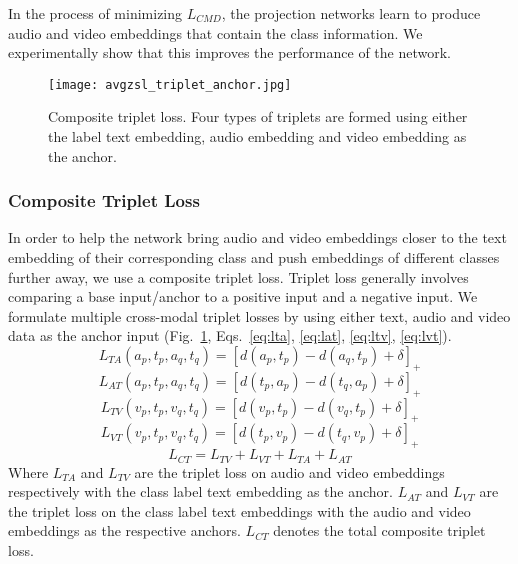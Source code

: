\documentclass[10pt,twocolumn,letterpaper]{article}
\begin{document}
In the process of minimizing $L_{CMD}$, the projection networks learn to produce audio and video embeddings that contain the class information. We experimentally show that this improves the performance of the network.


\begin{figure}[t]
  \centering
  \texttt{[image: avgzsl\_triplet\_anchor.jpg]}
\caption{Composite triplet loss. Four types of triplets are formed using either the label text embedding, audio embedding and video embedding as the anchor.}
\label{fig:triploss}
 \vspace{-10pt}
\end{figure}


\subsubsection{Composite Triplet Loss}\label{sec:ct}
In order to help the network bring audio and video embeddings closer to the text embedding of their corresponding class and push embeddings of different classes further away, we use a composite triplet loss. Triplet loss generally involves comparing a base input/anchor to a positive input and a negative input. We formulate multiple cross-modal triplet losses by using either text, audio and video data as the anchor input (Fig.~\ref{fig:triploss}, Eqs.~\ref{eq:lta}, \ref{eq:lat}, \ref{eq:ltv}, \ref{eq:lvt}).
\begin{equation}\label{eq:lta}
    L_{TA}(a_p,t_p,a_q,t_q) = [d(a_p,t_p)-d(a_q,t_p)+\delta]_{+} 
\end{equation}
\begin{equation}\label{eq:lat}
    L_{AT}(a_p,t_p,a_q,t_q) = [d(t_p,a_p)-d(t_q,a_p)+\delta]_{+}
\end{equation}
\begin{equation}\label{eq:ltv}
    L_{TV}(v_p,t_p,v_q,t_q) = [d(v_p,t_p)-d(v_q,t_p)+\delta]_{+}
\end{equation}
\begin{equation}\label{eq:lvt}
    L_{VT}(v_p,t_p,v_q,t_q) = [d(t_p,v_p)-d(t_q,v_p)+\delta]_{+}
\end{equation}
\begin{equation}\label{eq:ct}
    L_{CT} =  L_{TV} + L_{VT} + L_{TA} + L_{AT}
\end{equation}
Where $L_{TA}$ and $L_{TV}$ are the triplet loss on audio and video embeddings respectively with the class label text embedding as the anchor. $L_{AT}$ and $L_{VT}$ are the triplet loss on the class label text embeddings with the audio and video embeddings as the respective anchors. $L_{CT}$ denotes the total composite triplet loss.
\end{document}
